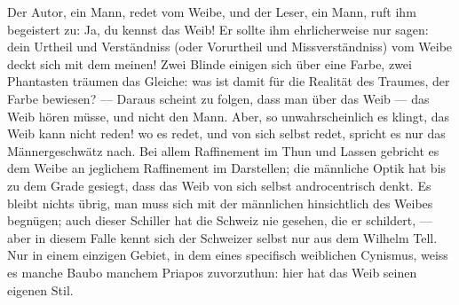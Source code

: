 Der Autor, ein Mann, redet vom Weibe, und der Leser, ein Mann, ruft ihm begeistert zu: Ja, du kennst das Weib! Er sollte ihm ehrlicherweise nur sagen: dein Urtheil und Verständniss (oder Vorurtheil und Missverständniss) vom Weibe deckt sich mit dem meinen! Zwei Blinde einigen sich über eine Farbe, zwei Phantasten träumen das Gleiche: was ist damit für die Realität des Traumes, der Farbe bewiesen? — Daraus scheint zu folgen, dass man über das Weib — das Weib hören müsse, und nicht den Mann. Aber, so unwahrscheinlich es klingt, das Weib kann nicht reden! wo es redet, und von sich selbst redet, spricht es nur das Männergeschwätz nach. Bei allem Raffinement im Thun und Lassen gebricht es dem Weibe an jeglichem Raffinement im Darstellen; die männliche Optik hat bis zu dem Grade gesiegt, dass das Weib von sich selbst androcentrisch denkt. Es bleibt nichts übrig, man muss sich mit der männlichen  hinsichtlich des Weibes begnügen; auch dieser Schiller hat die Schweiz nie gesehen, die er schildert, — aber in diesem Falle kennt sich der Schweizer selbst nur aus dem Wilhelm Tell. Nur in einem einzigen Gebiet, in dem eines specifisch weiblichen Cynismus, weiss es manche Baubo manchem Priapos zuvorzuthun: hier hat das Weib seinen eigenen Stil.
\par

